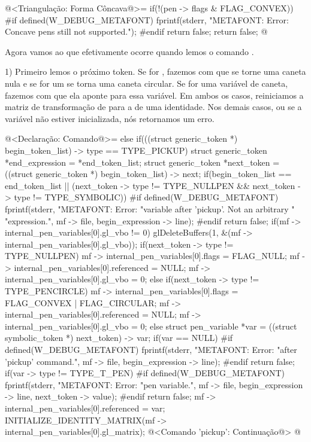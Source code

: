 {\iniciocodigo
@<Triangulação: Forma Côncava@>=
if(!(pen -> flags & FLAG_CONVEX)){
#if defined(W_DEBUG_METAFONT)
  fprintf(stderr, "METAFONT: Error: Concave pens still not supported.\n");
#endif
  return false;
}
return false;
@
\fimcodigo


Agora vamos ao que efetivamente ocorre quando lemos o
comando .

1) Primeiro lemos o próximo token. Se for ,
fazemos com que  se torne uma caneta nula e se
for um  se torna uma caneta circular. Se for uma
variável de caneta, fazemos com que ela aponte para essa variável. Em
ambos os casos, reiniciamos a matriz de transformação
de  para a de uma identidade. Nos demais casos,
ou se a variável não estiver inicializada, nós retornamos um erro.

\iniciocodigo
@<Declaração: Comando@>=
else if(((struct generic_token *) begin_token_list) -> type == TYPE_PICKUP){
  struct generic_token *end_expression = *end_token_list;
  struct generic_token *next_token =
                           ((struct generic_token *) begin_token_list) -> next;
  if(begin_token_list == end_token_list ||
     (next_token -> type != TYPE_NULLPEN &&
      next_token -> type != TYPE_SYMBOLIC)){
#if defined(W_DEBUG_METAFONT)
    fprintf(stderr, "METAFONT: Error: %
                    "variable after 'pickup'. Not an arbitrary "
                    "expression.\n",
            mf -> file, begin_expression -> line);
#endif
    return false;
  }
  if(mf -> internal_pen_variables[0].gl_vbo != 0)
    glDeleteBuffers(1, &(mf -> internal_pen_variables[0].gl_vbo));
  if(next_token -> type != TYPE_NULLPEN){
    mf -> internal_pen_variables[0].flags = FLAG_NULL;
    mf -> internal_pen_variables[0].referenced = NULL;
    mf -> internal_pen_variables[0].gl_vbo = 0;
  }
  else if(next_token -> type != TYPE_PENCIRCLE){
    mf -> internal_pen_variables[0].flags = FLAG_CONVEX | FLAG_CIRCULAR;
     mf -> internal_pen_variables[0].referenced = NULL;
    mf -> internal_pen_variables[0].gl_vbo = 0;
  }
  else{
    struct pen_variable *var = ((struct symbolic_token *) next_token) -> var;
    if(var == NULL){
#if defined(W_DEBUG_METAFONT)
      fprintf(stderr, "METAFONT: Error: %
                      "after 'pickup' command.\n",
              mf -> file, begin_expression -> line);
#endif
      return false;
    }
    if(var -> type != TYPE_T_PEN){
#if defined(W_DEBUG_METAFONT)
      fprintf(stderr, "METAFONT: Error: %
                      "pen variable.\n",
              mf -> file, begin_expression -> line, next_token -> value);
#endif
      return false;
    }
    mf -> internal_pen_variables[0].referenced = var;
  }
  INITIALIZE_IDENTITY_MATRIX(mf -> internal_pen_variables[0].gl_matrix);
  @<Comando 'pickup': Continuação@>
}
@
\fimcodigo

}
